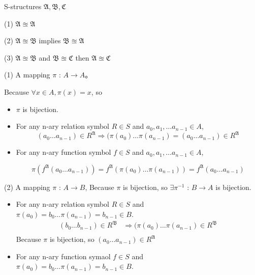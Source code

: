 \documentclass{ximera}
\begin{document}
\begin{problem}
        S-structures $\mathfrak{A}, \mathfrak{B},\mathfrak{C}$

        (1) $\mathfrak{A} \approxeq \mathfrak{A}$

        (2) $\mathfrak{A} \approxeq \mathfrak{B}$  implies  $\mathfrak{B} \approxeq \mathfrak{A}$

        (3) $\mathfrak{A} \approxeq \mathfrak{B}$ and $\mathfrak{B} \approxeq \mathfrak{C}$ then $\mathfrak{A} \approxeq \mathfrak{C}$
        \begin{solution}
            (1) A mapping $\pi$ : $A \rightarrow A$。
            
            Because $\forall x \in A, \pi(x) = x$, so 
            \begin{itemize}
                \item $\pi$ is  bijection.
                \item For any n-ary relation symbol $R \in S$ and $a_0, a_1, \dots a_{n-1} \in A$, 
                $$(a_0 \dots a_{n-1}) \in R^{\mathfrak{A}}\Rightarrow (\pi(a_0) \dots \pi(a_{n-1})=(a_0 \dots a_{n-1}) \in R^{\mathfrak{A}}$$
                \item For any n-ary function symbol $f \in S$ and $a_0, a_1, \dots a_{n-1} \in A$, 
                
                $$\pi (f^{\mathfrak{A}}(a_0 \dots a_{n-1})) = f^{\mathfrak{A}}(\pi(a_0) \dots \pi(a_{n-1})) 
                                                                = f^{\mathfrak{A}}(a_0 \dots a_{n-1})$$
            \end{itemize}

            (2) A mapping $\pi$ : $A \rightarrow B$, Because $\pi$ is bijection, so $\exists \pi^{-1}$ : $B \rightarrow A$ is bijection.
            \begin{itemize}
            \item For any n-ary relation symbol $R \in S$ and $\pi(a_0)=b_0 \dots \pi(a_{n-1})=b_{n-1} \in B$.
            $$
            \begin{aligned}
                (b_0 \dots b_{n-1}) \in R^{\mathfrak{B}} &\Rightarrow (\pi(a_0) \dots \pi(a_{n-1}) \in R^{\mathfrak{B}}\\
            \end{aligned}
            $$
            Because $\pi$ is  bijection, so $(a_0 \dots a_{n-1}) \in R^{\mathfrak{A}}$
            \item For any n-ary function symaol $f \in S$ and $\pi(a_0)=b_0 \dots \pi(a_{n-1})=b_{n-1} \in B$.
            

\end{itemize}
\end{solution}
\end{problem}
\end{document}
